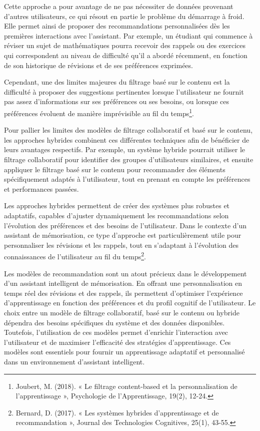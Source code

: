 \documentclass[11pt,a4paper]{report}
\begin{document}
Cette approche a pour avantage de ne pas nécessiter de données provenant d’autres utilisateurs, ce qui résout en partie le problème du démarrage à froid. Elle permet ainsi de proposer des recommandations personnalisées dès les premières interactions avec l’assistant. Par exemple, un étudiant qui commence à réviser un sujet de mathématiques pourra recevoir des rappels ou des exercices qui correspondent au niveau de difficulté qu’il a abordé récemment, en fonction de son historique de révisions et de ses préférences exprimées.

Cependant, une des limites majeures du filtrage basé sur le contenu est la difficulté à proposer des suggestions pertinentes lorsque l'utilisateur ne fournit pas assez d'informations sur ses préférences ou ses besoins, ou lorsque ces préférences évoluent de manière imprévisible au fil du temps\footnote{Joubert, M. (2018). « Le filtrage content-based et la personnalisation de l’apprentissage », Psychologie de l'Apprentissage, 19(2), 12-24.}.

Pour pallier les limites des modèles de filtrage collaboratif et basé sur le contenu, les approches hybrides combinent ces différentes techniques afin de bénéficier de leurs avantages respectifs. Par exemple, un système hybride pourrait utiliser le filtrage collaboratif pour identifier des groupes d’utilisateurs similaires, et ensuite appliquer le filtrage basé sur le contenu pour recommander des éléments spécifiquement adaptés à l'utilisateur, tout en prenant en compte les préférences et performances passées.

Les approches hybrides permettent de créer des systèmes plus robustes et adaptatifs, capables d’ajuster dynamiquement les recommandations selon l’évolution des préférences et des besoins de l’utilisateur. Dans le contexte d’un assistant de mémorisation, ce type d’approche est particulièrement utile pour personnaliser les révisions et les rappels, tout en s’adaptant à l’évolution des connaissances de l’utilisateur au fil du temps\footnote{Bernard, D. (2017). « Les systèmes hybrides d’apprentissage et de recommandation », Journal des Technologies Cognitives, 25(1), 43-55.}.

Les modèles de recommandation sont un atout précieux dans le développement d’un assistant intelligent de mémorisation. En offrant une personnalisation en temps réel des révisions et des rappels, ils permettent d'optimiser l’expérience d’apprentissage en fonction des préférences et du profil cognitif de l’utilisateur. Le choix entre un modèle de filtrage collaboratif, basé sur le contenu ou hybride dépendra des besoins spécifiques du système et des données disponibles. Toutefois, l'utilisation de ces modèles permet d’enrichir l’interaction avec l’utilisateur et de maximiser l’efficacité des stratégies d’apprentissage. Ces modèles sont essentiels pour fournir un apprentissage adaptatif et personnalisé dans un environnement d’assistant intelligent.
\end{document}
